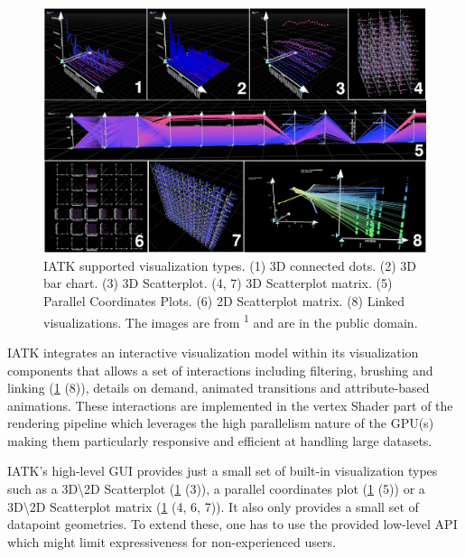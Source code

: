\documentclass{vgtc}                          %
\begin{document}
\begin{figure}[tb]
	\centering
	\includegraphics[width=\columnwidth]{iatk}
	\caption[Caption for IATK]{IATK supported visualization types. (1) 3D
		connected dots. (2) 3D bar chart. (3) 3D Scatterplot. (4, 7) 3D
		Scatterplot matrix. (5) Parallel Coordinates Plots. (6) 2D Scatterplot
		matrix. (8) Linked visualizations. The images are from \textsuperscript{1}
		and are in the public domain.}
	\label{fig:iatk_visualizations}
\end{figure}


\smallskip

\noindent IATK integrates an interactive visualization model within its
visualization components that allows a set of interactions including filtering,
brushing and linking (\ref{fig:iatk_visualizations} (8)), details on demand,
animated transitions and attribute-based animations. These interactions are
implemented in the vertex Shader part of the rendering pipeline which leverages
the high parallelism nature of the GPU(s) making them particularly responsive
and efficient at handling large datasets.

\smallskip

\noindent IATK's high-level GUI provides just a small set of built-in visualization
types such as a 3D\textbackslash2D Scatterplot (\ref{fig:iatk_visualizations}
(3)), a parallel coordinates plot (\ref{fig:iatk_visualizations} (5)) or a
3D\textbackslash2D Scatterplot matrix (\ref{fig:iatk_visualizations} (4, 6, 7)).
It also only provides a small set of datapoint geometries. To extend these,
one has to use the provided low-level API which might limit expressiveness for
non-experienced users.

\smallskip
\end{document}
